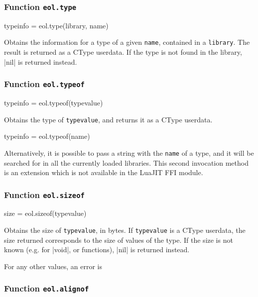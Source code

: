 \subsubsection{Function \texttt{eol.type}}
	\label{sec:eol-api-type}

\begin{luacode}
typeinfo = eol.type(library, name)
\end{luacode}

Obtains the information for a type of a given \texttt{name}, contained in
a \texttt{library}. The result is returned as a \textsf{CType} userdata. If
the type is not found in the library, \Mlua|nil| is returned instead.


\subsubsection{Function \texttt{eol.typeof}}
	\label{sec:eol-api-typeof}

\begin{luacode}
	typeinfo = eol.typeof(typevalue)
\end{luacode}

Obtains the type of \texttt{typevalue}, and returns it as a \textsf{CType}
userdata.

\begin{luacode}
	typeinfo = eol.typeof(name)
\end{luacode}

Alternatively, it is possible to pass a string with the \texttt{name} of
a type, and it will be searched for in all the currently loaded libraries.
This second invocation method is an \Eol* extension which is not available in
the LuaJIT FFI module.

\subsubsection{Function \texttt{eol.sizeof}}

\begin{luacode}
  size = eol.sizeof(typevalue)
\end{luacode}

Obtains the size of \texttt{typevalue}, in bytes. If \texttt{typevalue} is
a \textsf{CType} userdata, the size returned corresponds to the size of values
of the type. If the size is not known (e.g. for \Mc|void|, or functions),
\Mlua|nil| is returned instead.

For any other values, an error is 

\subsubsection{Function \texttt{eol.alignof}}
	\label{sec:eol-api-alignof}

